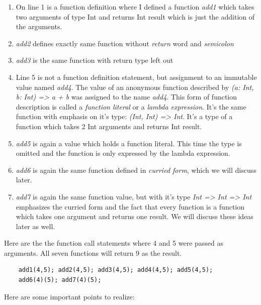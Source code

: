 \documentclass[12pt,twoside,a4paper]{report}
\begin{document}
\begin{enumerate}\itemsep1pt \parskip0pt 
\item On line 1 is a function definition where I defined a function \emph{add1} which takes two arguments of type Int and returns Int result which is just the addition of the arguments.
\item \emph{add2} defines exactly same function without \emph{return} word and \emph{semicolon}
\item \emph{add3} is the same function with return type left out
\item Line 5 is not a function definition statement, but assignment to an  
immutable value named \emph{add4}. The value of an anonymous function described by \emph{(a: Int, b: Int) => a + b} was assigned to the name \emph{add4}. This form of function description is called a \emph{function literal} or a \emph{lambda expression}. It's the same function with emphasis on it's type: \emph{(Int, Int) => Int}. It's a type of a function which takes 2 Int arguments and returns Int result. 
\item \emph{add5} is again a value which holds a function literal. This time the type is omitted and the function is only expressed by the lambda expression.
\item \emph{add6} is again the same function defined in \emph{curried form}, which we will discuss later.
\item \emph{add7} is again the same function value, but with it's type \emph{Int => Int => Int} emphasizes the curried form and the fact that every function is a function which takes one argument and returns one result. We will discuss these ideas later as well.
\end{enumerate}

Here are the the function call statements where 4 and 5 were passed as arguments. All seven functions will return 9 as the result. 
\begin{lstlisting}
	add1(4,5); add2(4,5); add3(4,5); add4(4,5);	add5(4,5); 
	add6(4)(5);	add7(4)(5);
\end{lstlisting}

Here are some important points to realize:
\end{document}
